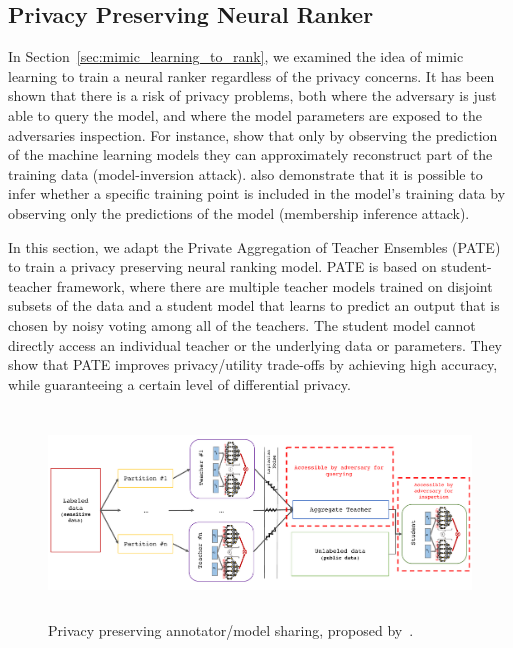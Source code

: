 \subsection{Privacy Preserving Neural Ranker}
In Section~\ref{sec:mimic_learning_to_rank}, we examined the idea of mimic learning to train a neural ranker regardless of the privacy concerns.
It has been shown that there is a risk of privacy problems, both where the adversary is just able to query the model, and where the model parameters are exposed to the adversaries inspection.
For instance, \citet{Fredrikson:2015} show that only by observing the prediction of the machine learning models they can approximately reconstruct part of the training data (model-inversion attack). \citet{Shokri:2016} also demonstrate that it is possible to infer whether a specific training point is included in the model's training data by observing only the predictions of the model (membership inference attack).

In this section, we adapt the Private Aggregation of Teacher Ensembles (PATE)~\citep{Papernot:2017} to train a privacy preserving neural ranking model.  PATE is based on student-teacher framework\cite{Hinton:2015}, where there are multiple teacher models trained on disjoint subsets of the data and a student model that learns to predict an output that is chosen by noisy voting among all of the teachers. The student model cannot directly access an individual teacher or the underlying data or parameters. They show that PATE improves privacy/utility trade-offs by achieving high accuracy, while guaranteeing a certain level of differential privacy.

\begin{figure}[t]
    \centering
    \includegraphics[height=5.5cm]{03-part-02/chapter-04/figs_and_tables/fig_privacy_preserving_ranker_model.pdf}%
    \caption{\label{fig:pp_model} Privacy preserving annotator/model sharing, proposed by~\citet{Papernot:2017}.}
\end{figure}

